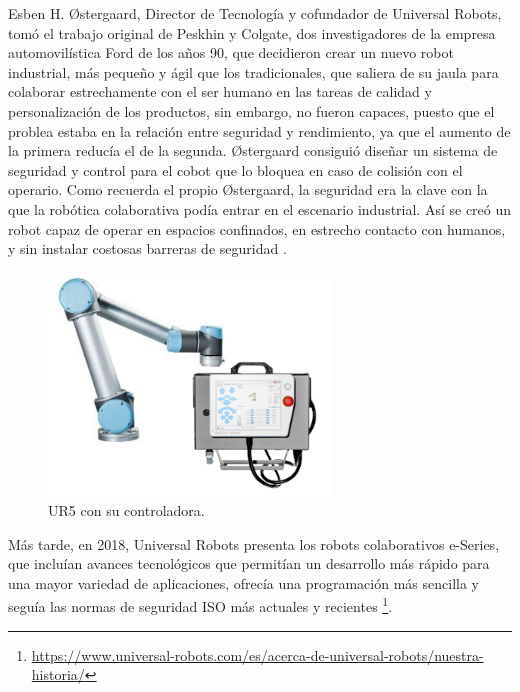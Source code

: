 Esben H. Østergaard, Director de Tecnología y cofundador de Universal Robots, tomó el trabajo original de Peskhin y Colgate, dos investigadores de la empresa automovilística Ford de los años 90, que decidieron crear un nuevo robot industrial, más pequeño y ágil que los tradicionales, que saliera de su jaula para colaborar estrechamente con el ser humano en las tareas de calidad y personalización de los productos, sin embargo, no fueron capaces, puesto que el problea estaba en la relación entre seguridad y rendimiento, ya que el aumento de la primera reducía el de la segunda. Østergaard consiguió diseñar un sistema de seguridad y control para el cobot que lo bloquea en caso de colisión con el operario. Como recuerda el propio Østergaard, la seguridad era la clave con la que la robótica colaborativa podía entrar en el escenario industrial. Así se creó un robot capaz de operar en espacios confinados, en estrecho contacto con humanos, y sin instalar costosas barreras de seguridad \cite{Cusano22}.
  
  \begin{figure} [h!]
    \begin{center}
      \includegraphics[width=75mm]{figs/UR5_controller.png}
    \end{center}
    \caption{UR5 con su controladora.}
    \label{fig:UR5}
  \end{figure}
  
  \pagebreak
  
Más tarde, en 2018, Universal Robots presenta los robots colaborativos e-Series, que incluían avances tecnológicos que permitían un desarrollo más rápido para una mayor variedad de aplicaciones, ofrecía una programación más sencilla y seguía las normas de seguridad ISO más actuales y recientes \footnote{\url{https://www.universal-robots.com/es/acerca-de-universal-robots/nuestra-historia/}}.
 
